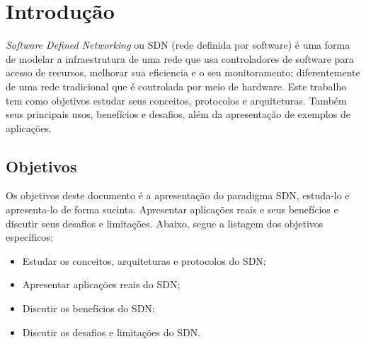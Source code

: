\chapter{Introdução}
\label{cap:intro}

\textit{Software Defined Networking} ou SDN (rede definida por software) é uma forma de modelar a infraestrutura de uma rede que usa
controladores de software para acesso de recursos, melhorar sua eficiencia e o seu monitoramento; diferentemente de uma rede
tradicional que é controlada por meio de hardware. Este trabalho tem como objetivos estudar seus conceitos, protocolos e
arquiteturas. Também seus principais usos, benefícios e desafios, além da apresentação de exemplos de aplicações.

\section{Objetivos}
\label{sec:objetivos}

Os objetivos deste documento é a apresentação do paradigma SDN, estuda-lo e apresenta-lo de forma sucinta. Apresentar
aplicações reais e seus benefícios e discutir seus desafios e limitações. Abaixo, segue a listagem dos objetivos específicos:

\begin{itemize}
    \item Estudar os conceitos, arquiteturas e protocolos do SDN;
    \item Apresentar aplicações reais do SDN;
    \item Discutir os benefícios do SDN;
    \item Discutir os desafios e limitações do SDN.
\end{itemize}
